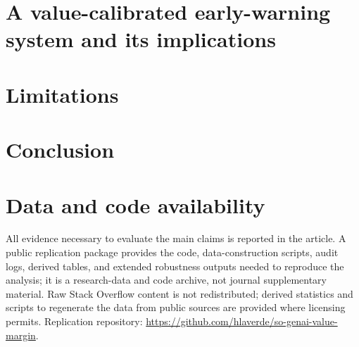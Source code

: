 \documentclass[12pt]{article}
\begin{document}
\section{A value-calibrated early-warning system and its
implications}\label{sec:policy}


\section{Limitations}\label{sec:limitations}


\section{Conclusion}\label{sec:conclusion}



\section*{Data and code availability}
All evidence necessary to evaluate the main claims is reported in
the article. A public replication package provides the code,
data-construction scripts, audit logs, derived tables, and
extended robustness outputs needed to reproduce the analysis; it
is a research-data and code archive, not journal supplementary
material. Raw Stack Overflow content is not redistributed;
derived statistics and scripts to regenerate the data from public
sources are provided where licensing permits. Replication
repository: \url{https://github.com/hlaverde/so-genai-value-margin}.



\end{document}
